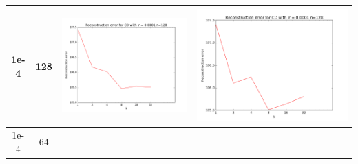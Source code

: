 \documentclass[12pt]{report}
\begin{document}
\begin{table}[H]
\begin{tabular}{ | c | c | c | c |}
    1e-4 & 128 &
    \begin{minipage}{.3\textwidth}
      \includegraphics[scale=0.2]{train_cd_lr_0_0001_n_128.png}
    \end{minipage} &
    \begin{minipage}{.3\textwidth}
      \includegraphics[scale=0.2]{cd_lr_0_0001_n_128.png}
    \end{minipage}
    \\ \hline
    1e-4 & 64 &
    \begin{minipage}{.3\textwidth}

\end{minipage}
\end{tabular}
\end{table}
\end{document}
